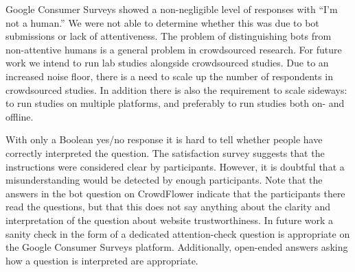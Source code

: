 \documentclass[twoside,letterpaper]{soups}
\begin{document}
Google Consumer Surveys showed a non-negligible level of responses with ``I'm not a human.'' We were not able to determine whether this was due to bot submissions or lack of attentiveness. The problem of distinguishing bots from non-attentive humans is a general problem in crowdsourced research. For future work we intend to run lab studies alongside crowdsourced studies. Due to an increased noise floor, there is a need to scale up the number of respondents in crowdsourced studies. In addition there is also the requirement to scale sideways: to run studies on multiple platforms, and preferably to run studies both on- and offline.

With only a Boolean yes/no response it is hard to tell whether people have correctly interpreted the question. The satisfaction survey suggests that the instructions were considered clear by participants. However, it is doubtful that a misunderstanding would be detected by enough participants. Note that the answers in the bot question on CrowdFlower indicate that the participants there read the questions, but that this does not say anything about the clarity and interpretation of the question about website trustworthiness. In future work a sanity check in the form of a dedicated attention-check question is appropriate on the Google Consumer Surveys platform. Additionally, open-ended answers asking how a question is interpreted are appropriate.



\end{document}
